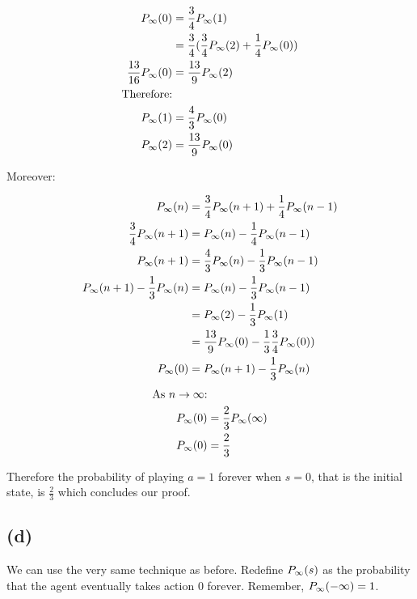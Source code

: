 \documentclass{article}
\begin{document}
\[
\begin{split}
  P_{\infty}(0)            & = \frac{3}{4}P_{\infty}(1) \\
                    & = \frac{3}{4}(\frac{3}{4}P_{\infty}(2) + \frac{1}{4}P_{\infty}(0)) \\
  \frac{13}{16}P_{\infty}(0)& = \frac{13}{9}P_{\infty}(2) \\
  \text{Therefore:} & \\
  P_{\infty}(1)            & = \frac{4}{3}P_{\infty}(0)\\
  P_{\infty}(2)            & = \frac{13}{9}P_{\infty}(0)\\
\end{split}
\]

Moreover:

\[
\begin{split}
  P_{\infty}(n)            & = \frac{3}{4}P_{\infty}(n + 1) + \frac{1}{4}P_{\infty}(n - 1) \\
  \frac{3}{4}P_{\infty}(n+1)& = P_{\infty}(n) - \frac{1}{4}P_{\infty}(n-1) \\
  P_{\infty}(n+1)          & = \frac{4}{3}P_{\infty}(n) - \frac{1}{3}P_{\infty}(n - 1) \\
  P_{\infty}(n+1) - \frac{1}{3}P_{\infty}(n) & = P_{\infty}(n) - \frac{1}{3}P_{\infty}(n - 1) \\
                    & = P_{\infty}(2) - \frac{1}{3}P_{\infty}(1) \\
                    & = \frac{13}{9}P_{\infty}(0) - \frac{1}{3}\frac{3}{4}P_{\infty}(0)) \\
  P_{\infty}(0)            & = P_{\infty}(n+1) - \frac{1}{3}P_{\infty}(n) \\
\end{split}
\]
\[
\begin{split}
  \text{As $n \to \infty$:} & \\
  P_{\infty}(0)            & = \frac{2}{3}P_{\infty}(\infty) \\
  P_{\infty}(0)            & = \frac{2}{3}
\end{split}
\]

Therefore the probability of playing $a = 1$ forever when $s = 0$, that is
the initial state, is $ \frac{2}{3}$ which concludes our proof.

\subsection{(d)} %

We can use the very same technique as before. Redefine $P_{\infty}(s)$ as the probability
that the agent eventually takes action $0$ forever. Remember, $P_{\infty}(-\infty) = 1$.
\end{document}
